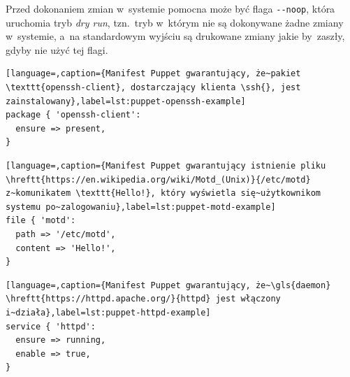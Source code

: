 \documentclass[thesis]{subfiles}
\begin{document}
Przed dokonaniem zmian w~systemie pomocna może być flaga \texttt{-{}-noop}, która uruchomia tryb \emph{dry run}, tzn.~tryb w~którym nie są dokonywane żadne zmiany w~systemie, a~na standardowym wyjściu są drukowane zmiany jakie by~zaszły, gdyby nie użyć tej flagi.

\begin{minipage}{\linewidth} %
\begin{lstlisting}[language=,caption={Manifest Puppet gwarantujący, że~pakiet \texttt{openssh-client}, dostarczający klienta \ssh{}, jest zainstalowany},label=lst:puppet-openssh-example]
package { 'openssh-client':
  ensure => present,
}
\end{lstlisting}
\end{minipage}

\begin{lstlisting}[language=,caption={Manifest Puppet gwarantujący istnienie pliku \hreftt{https://en.wikipedia.org/wiki/Motd_(Unix)}{/etc/motd} z~komunikatem \texttt{Hello!}, który wyświetla się~użytkownikom systemu po~zalogowaniu},label=lst:puppet-motd-example]
file { 'motd':
  path => '/etc/motd',
  content => 'Hello!',
}
\end{lstlisting}

\begin{lstlisting}[language=,caption={Manifest Puppet gwarantujący, że~\gls{daemon} \hreftt{https://httpd.apache.org/}{httpd} jest włączony i~działa},label=lst:puppet-httpd-example]
service { 'httpd':
  ensure => running,
  enable => true,
}
\end{lstlisting}
\end{document}
